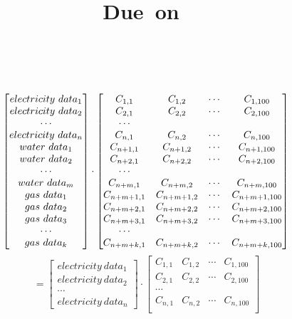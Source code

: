 \documentclass[a4paper]{article}
\title{
    \vspace{2in}
    \textmd{\textbf{\hmwkClass \linebreak \hmwkTitle}}\\
    \normalsize\vspace{0.1in}\small{Due\ on\ \hmwkDueDate}\\
    \vspace{0.1in}\large{\textit{\hmwkClassInstructor\ \hmwkClassTime}}
    \vspace{3in}
}
\author{\textbf{\hmwkAuthorName}}
\date{\textbf{\hmwkAuthorID}}
\begin{document}
\maketitle

\pagebreak

\begin{equation*}
\begin{bmatrix}
electricity\ data_1\\
electricity\ data_2\\
\cdots\\
electricity\ data_n\\
water\ data_1\\
water\ data_2\\
\cdots \\
water\ data_m\\
gas\ data_1\\
gas\ data_2\\
gas\ data_3\\
\cdots \\
gas\ data_k
\end{bmatrix}\cdot 
\begin{bmatrix}
C_{1,1}&C_{1,2} &\cdots &C_{1,100}\\
C_{2,1}&C_{2,2} &\cdots &C_{2,100}\\
\cdots\\
C_{n,1}&C_{n,2} &\cdots &C_{n,100}\\
C_{n+1,1}&C_{n+1,2} &\cdots &C_{n+1,100}\\
C_{n+2,1}&C_{n+2,2} &\cdots &C_{n+2,100}\\
\cdots\\
C_{n+m,1}&C_{n+m,2} &\cdots &C_{n+m,100}\\
C_{n+m+1,1}&C_{n+m+1,2} &\cdots &C_{n+m+1,100}\\
C_{n+m+2,1}&C_{n+m+2,2} &\cdots &C_{n+m+2,100}\\
C_{n+m+3,1}&C_{n+m+3,2} &\cdots &C_{n+m+3,100}\\
\cdots\\
C_{n+m+k,1}&C_{n+m+k,2} &\cdots &C_{n+m+k,100}\\
\end{bmatrix}\\
\end{equation*}
\begin{equation*}
=\begin{bmatrix}
electricity\ data_1\\
electricity\ data_2\\
\cdots \\
electricity\ data_n
\end{bmatrix}\cdot
\begin{bmatrix}
C_{1,1}&C_{1,2} &\cdots &C_{1,100}\\
C_{2,1}&C_{2,2} &\cdots &C_{2,100}\\
\cdots\\
C_{n,1}&C_{n,2} &\cdots &C_{n,100}\\
\end{bmatrix}
\end{equation*}
\end{document}
